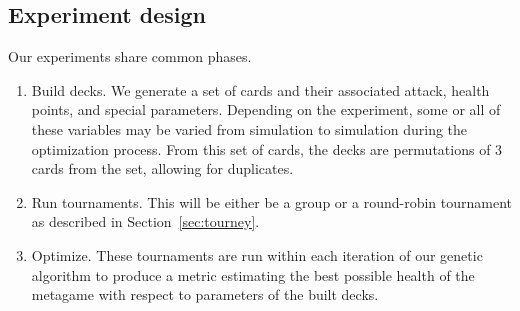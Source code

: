 \subsection{Experiment design}


Our experiments share common phases.

\begin{enumerate}
	\item Build decks. We generate a set of cards and their associated attack, health points, and special parameters.
	Depending on the experiment, some or all of these variables may be varied from simulation to simulation during the optimization process.
	From this set of cards, the decks are permutations of 3 cards from the set, allowing for duplicates.
	\item Run tournaments. This will be either be a group or a round-robin tournament as described in Section~\ref{sec:tourney}.
	\item Optimize. These tournaments are run within each iteration of our genetic algorithm to produce a metric estimating the best
	possible health of the metagame with respect to parameters of the built decks.
\end{enumerate}
